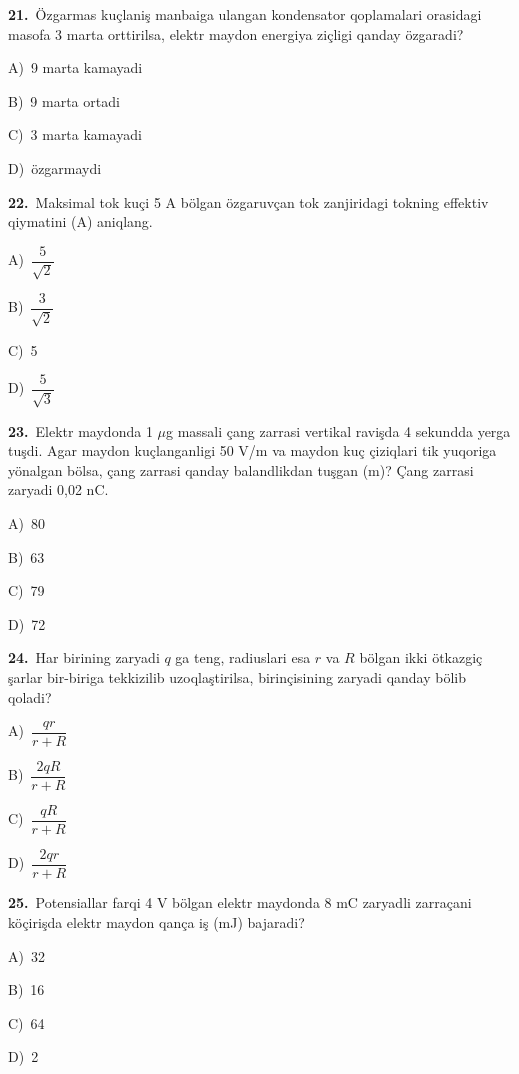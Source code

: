 \documentclass[11pt,a4paper]{article}
\newcommand{\opt}[2]{\hspace*{4mm}#1)\ #2\par}
\begin{document}
\noindent\begin{minipage}{\linewidth}
\textbf{21.}\ Özgarmas kuçlaniş manbaiga ulangan kondensator qoplamalari orasidagi masofa 3 marta orttirilsa, elektr maydon energiya ziçligi qanday özgaradi?\par\smallskip
\opt{A}{9 marta kamayadi}
\opt{B}{9 marta ortadi}
\opt{C}{3 marta kamayadi}
\opt{D}{özgarmaydi}
\end{minipage}\vspace{9pt}\par
\noindent\begin{minipage}{\linewidth}
\textbf{22.}\ Maksimal tok kuçi 5 A bölgan özgaruvçan tok zanjiridagi tokning effektiv qiymatini (A) aniqlang.\par\smallskip
\opt{A}{$\dfrac{5}{\sqrt{2}}$}
\opt{B}{$\dfrac{3}{\sqrt{2}}$}
\opt{C}{5}
\opt{D}{$\dfrac{5}{\sqrt{3}}$}
\end{minipage}\vspace{9pt}\par
\noindent\begin{minipage}{\linewidth}
\textbf{23.}\ Elektr maydonda 1 $\mu$g massali çang zarrasi vertikal ravişda 4 sekundda yerga tuşdi. Agar maydon kuçlanganligi 50 V/m va maydon kuç çiziqlari tik yuqoriga yönalgan bölsa, çang zarrasi qanday balandlikdan tuşgan (m)? Çang zarrasi zaryadi 0,02 nC.\par\smallskip
\opt{A}{80}
\opt{B}{63}
\opt{C}{79}
\opt{D}{72}
\end{minipage}\vspace{9pt}\par
\noindent\begin{minipage}{\linewidth}
\textbf{24.}\ Har birining zaryadi $q$ ga teng, radiuslari esa $r$ va $R$ bölgan ikki ötkazgiç şarlar bir-biriga tekkizilib uzoqlaştirilsa, birinçisining zaryadi qanday bölib qoladi?\par\smallskip
\opt{A}{$\dfrac{qr}{r+R}$}
\opt{B}{$\dfrac{2qR}{r+R}$}
\opt{C}{$\dfrac{qR}{r+R}$}
\opt{D}{$\dfrac{2qr}{r+R}$}
\end{minipage}\vspace{9pt}\par
\noindent\begin{minipage}{\linewidth}
\textbf{25.}\ Potensiallar farqi 4 V bölgan elektr maydonda 8 mC zaryadli zarraçani köçirişda elektr maydon qança iş (mJ) bajaradi?\par\smallskip
\opt{A}{32}
\opt{B}{16}
\opt{C}{64}
\opt{D}{2}
\end{minipage}\vspace{9pt}\par
\end{document}
